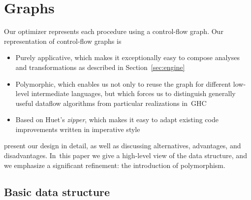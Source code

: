 \documentclass[blockstyle,preprint,nocopyrightspace]{sigplanconf}
\newcommand\secref[1]{Section~\ref{sec:#1}}
\newcommand\seclabel[1]{\label{sec:#1}}
\begin{document}
% 
% 
% 

\section{Graphs}
\seclabel{graphs}

Our optimizer represents each procedure using a control-flow graph.
Our representation of control-flow graphs is
\begin{itemize}
\item
Purely applicative, which makes it exceptionally easy to compose
analyses and transformations as described in \secref{engine}
\item
Polymorphic, which enables us not only to reuse the graph for
different low-level intermediate languages, but which forces us to
distinguish generally useful dataflow algorithms from particular
realizations in~GHC
\item
Based on Huet's \citeyearpar{huet:zipper} \emph{zipper},
which makes it easy to adapt existing code improvements written in
imperative style
\end{itemize}
\citet{dias-ramsey:applicative-flow-graph} present our design in
detail, as well as discussing alternatives, advantages, and
disadvantages.
In~this paper we give a high-level view of the data structure, and we
emphasize a significant refinement: the introduction of polymorphism.

\subsection{Basic data structure}
\end{document}
